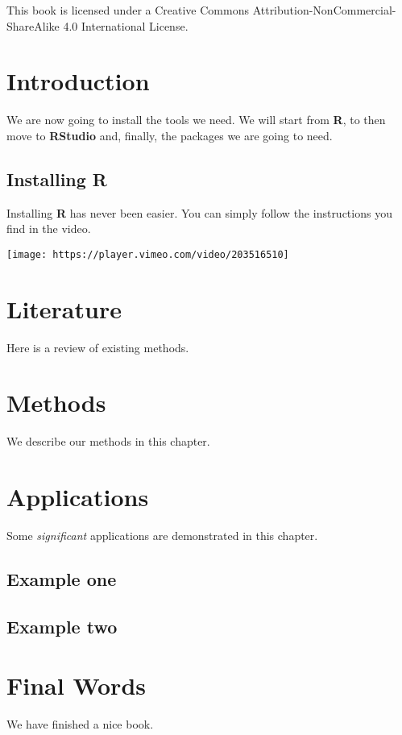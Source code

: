 \documentclass[
]{book}
\begin{document}
This book is licensed under a Creative Commons Attribution-NonCommercial-ShareAlike 4.0 International License.

\hypertarget{intro}{%
\chapter{Introduction}\label{intro}}

We are now going to install the tools we need. We will start from \textbf{R}, to then move to \textbf{RStudio} and, finally, the packages we are going to need.

\hypertarget{installing-r}{%
\section{Installing R}\label{installing-r}}

Installing \textbf{R} has never been easier. You can simply follow the instructions you find in the video.

\texttt{[image: https://player.vimeo.com/video/203516510]}

\hypertarget{literature}{%
\chapter{Literature}\label{literature}}

Here is a review of existing methods.

\hypertarget{methods}{%
\chapter{Methods}\label{methods}}

We describe our methods in this chapter.

\hypertarget{applications}{%
\chapter{Applications}\label{applications}}

Some \emph{significant} applications are demonstrated in this chapter.

\hypertarget{example-one}{%
\section{Example one}\label{example-one}}

\hypertarget{example-two}{%
\section{Example two}\label{example-two}}

\hypertarget{final-words}{%
\chapter{Final Words}\label{final-words}}

We have finished a nice book.

  
\end{document}

